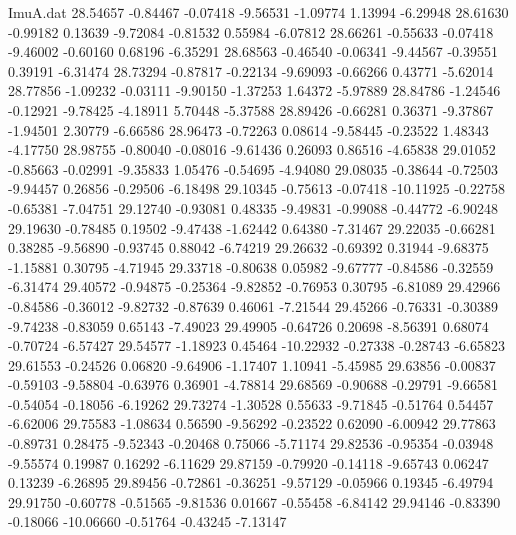 \begin{filecontents}{ImuA.dat}
  28.54657   -0.84467   -0.07418   -9.56531   -1.09774    1.13994   -6.29948
  28.61630   -0.99182    0.13639   -9.72084   -0.81532    0.55984   -6.07812
  28.66261   -0.55633   -0.07418   -9.46002   -0.60160    0.68196   -6.35291
  28.68563   -0.46540   -0.06341   -9.44567   -0.39551    0.39191   -6.31474
  28.73294   -0.87817   -0.22134   -9.69093   -0.66266    0.43771   -5.62014
  28.77856   -1.09232   -0.03111   -9.90150   -1.37253    1.64372   -5.97889
  28.84786   -1.24546   -0.12921   -9.78425   -4.18911    5.70448   -5.37588
  28.89426   -0.66281    0.36371   -9.37867   -1.94501    2.30779   -6.66586
  28.96473   -0.72263    0.08614   -9.58445   -0.23522    1.48343   -4.17750
  28.98755   -0.80040   -0.08016   -9.61436    0.26093    0.86516   -4.65838
  29.01052   -0.85663   -0.02991   -9.35833    1.05476   -0.54695   -4.94080
  29.08035   -0.38644   -0.72503   -9.94457    0.26856   -0.29506   -6.18498
  29.10345   -0.75613   -0.07418  -10.11925   -0.22758   -0.65381   -7.04751
  29.12740   -0.93081    0.48335   -9.49831   -0.99088   -0.44772   -6.90248
  29.19630   -0.78485    0.19502   -9.47438   -1.62442    0.64380   -7.31467
  29.22035   -0.66281    0.38285   -9.56890   -0.93745    0.88042   -6.74219
  29.26632   -0.69392    0.31944   -9.68375   -1.15881    0.30795   -4.71945
  29.33718   -0.80638    0.05982   -9.67777   -0.84586   -0.32559   -6.31474
  29.40572   -0.94875   -0.25364   -9.82852   -0.76953    0.30795   -6.81089
  29.42966   -0.84586   -0.36012   -9.82732   -0.87639    0.46061   -7.21544
  29.45266   -0.76331   -0.30389   -9.74238   -0.83059    0.65143   -7.49023
  29.49905   -0.64726    0.20698   -8.56391    0.68074   -0.70724   -6.57427
  29.54577   -1.18923    0.45464  -10.22932   -0.27338   -0.28743   -6.65823
  29.61553   -0.24526    0.06820   -9.64906   -1.17407    1.10941   -5.45985
  29.63856   -0.00837   -0.59103   -9.58804   -0.63976    0.36901   -4.78814
  29.68569   -0.90688   -0.29791   -9.66581   -0.54054   -0.18056   -6.19262
  29.73274   -1.30528    0.55633   -9.71845   -0.51764    0.54457   -6.62006
  29.75583   -1.08634    0.56590   -9.56292   -0.23522    0.62090   -6.00942
  29.77863   -0.89731    0.28475   -9.52343   -0.20468    0.75066   -5.71174
  29.82536   -0.95354   -0.03948   -9.55574    0.19987    0.16292   -6.11629
  29.87159   -0.79920   -0.14118   -9.65743    0.06247    0.13239   -6.26895
  29.89456   -0.72861   -0.36251   -9.57129   -0.05966    0.19345   -6.49794
  29.91750   -0.60778   -0.51565   -9.81536    0.01667   -0.55458   -6.84142
  29.94146   -0.83390   -0.18066  -10.06660   -0.51764   -0.43245   -7.13147

\end{filecontents}
